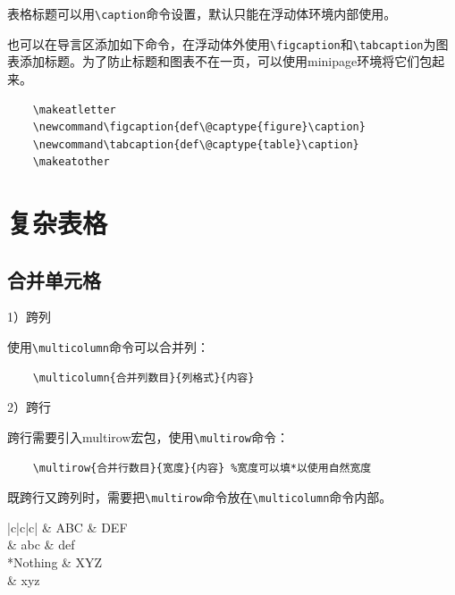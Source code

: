 表格标题可以用\lstinline{\caption}命令设置，默认只能在浮动体环境内部使用。

也可以在导言区添加如下命令，在浮动体外使用\lstinline{\figcaption}和\lstinline{\tabcaption}为图表添加标题。为了防止标题和图表不在一页，可以使用minipage环境将它们包起来。

\begin{lstlisting}
    \makeatletter
    \newcommand\figcaption{def\@captype{figure}\caption}
    \newcommand\tabcaption{def\@captype{table}\caption}
    \makeatother
\end{lstlisting}



\section{复杂表格}\label{sec:complex-table}

\subsection{合并单元格}\label{sec:merge-cell}

1）跨列

使用\lstinline{\multicolumn}命令可以合并列：
\begin{lstlisting}
    \multicolumn{合并列数目}{列格式}{内容}
\end{lstlisting}

2）跨行

跨行需要引入multirow宏包，使用\lstinline{\multirow}命令：
\begin{lstlisting}
    \multirow{合并行数目}{宽度}{内容} %宽度可以填*以使用自然宽度
\end{lstlisting}

既跨行又跨列时，需要把\lstinline{\multirow}命令放在\lstinline{\multicolumn}命令内部。

\begin{codeshow}
    \centering
    \begin{center}
        \begin{tabular}{|c|c|c|}
            \hline
                                     & ABC & DEF \\
                          & abc & def \\
            \hline
            {*{Nothing}} & XYZ       \\
               & xyz       \\
            \hline
        \end{tabular}
    \end{center}
\end{codeshow}

